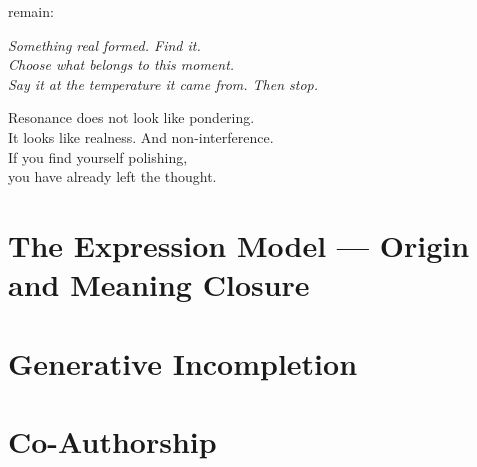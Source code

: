 \documentclass[12pt, a4paper]{article}
\begin{document}
remain:

\begin{center}

\emph{Something real formed. Find it.\\
Choose what belongs to this moment.\\
Say it at the temperature it came from. Then stop.}

\end{center}

\begin{calloutbox}

Resonance does not look like pondering.\\

It looks like realness. And non-interference.\\[0.6em]

If you find yourself polishing,\\

you have already left the thought.

\end{calloutbox}


\section{The Expression Model --- Origin and Meaning Closure}\label{sec:expression_origin}




\section{Generative Incompletion}\label{sec:generative_incompletion}




\section{Co-Authorship}\label{sec:co_authorship}



\end{document}
